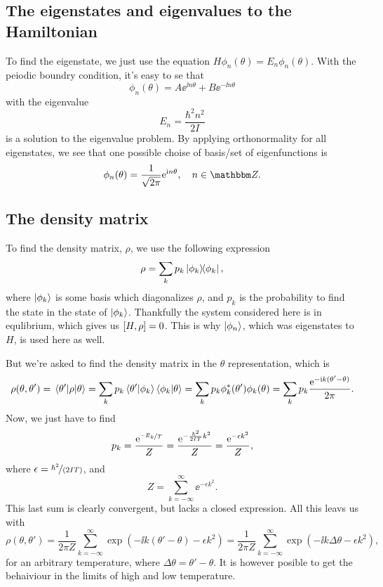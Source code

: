 \documentclass[11pt,letter, swedish, english
]{article}
\begin{document}
\subsection{The eigenstates and eigenvalues to the Hamiltonian}
To find the eigenstate, we just use the equation
$H\phi_n(\theta)=E_n\phi_n(\theta)$. With the peiodic boundry
condition, it's easy to se that
\begin{equation}
\phi_n(\theta)= A\ee^{\ii n\theta}+B\ee^{-\ii n\theta}
\end{equation}
with the eigenvalue
\begin{equation}
E_n=\frac{\hbar^2n^2}{2I}
\end{equation}
is a solution to the eigenvalue problem. By applying orthonormality
for all eigenstates, we see that one possible choise
of basis/set of eigenfunctions is
\begin{equation}
\phi_n(\theta)=\frac{1}{\sqrt{2\pi}}\ee^{\ii n\theta}\qcomma n\in\Z.
\end{equation}


\subsection{The density matrix}
To find the density matrix, $\rho$, we use the following expression
\begin{equation}
\rho = \sum_k p_k \op{\phi_k},
\end{equation}
where $\ket{\phi_k}$ is some basis which diagonalizes $\rho$, and
$p_k$ is the probability to find the state in the state of
$\ket{\phi_k}$. Thankfully the system considered here is in
equlibrium, which gives us $\comm{H}{\rho}=0$. This is why
$\ket{\phi_n}$, which was eigenstates to $H$, is used here as well. 

But we're asked to find the density matrix in the
$\theta$ representation, which is
\begin{equation}
\rho(\theta, \theta') = \mel{\theta'}{\rho}{\theta}
= \sum_k p_k \ip{\theta'}{\phi_k}\ip{\phi_k}{\theta}
= \sum_k p_k \phi_k^*(\theta')\phi_k(\theta)
= \sum_k p_k \frac{\ee^{-\ii k (\theta'-\theta)}}{2\pi}.
\end{equation}
Now, we just have to find
\begin{equation}
p_k = \frac{\mathrm{e}^{\nicefrac{-E_k}{T}}}{Z} 
=\frac{\mathrm{e}^{-\frac{\hbar^2}{2IT}k^2}}{Z} 
=\frac{\mathrm{e}^{-\epsilon k^2}}{Z}, 
\end{equation}
where $\epsilon=\nicefrac{\hbar^2}{(2IT)}$, and
\begin{equation}
Z=\sum_{k=-\infty}^\infty\ee^{-\epsilon k^2}.
\end{equation}
This last sum is clearly convergent, but lacks a closed
expression. All this leavs us with
\begin{equation}
\rho(\theta, \theta')
= \frac{1}{2\pi Z} 
\sum_{k=-\infty}^\infty \exp(-\ii k(\theta'-\theta) -\epsilon k^2)
= \frac{1}{2\pi Z} 
\sum_{k=-\infty}^\infty \exp(-\ii k\Delta\theta -\epsilon k^2),
\end{equation}
for an arbitrary temperature, where $\Delta\theta=\theta'-\theta$. It
is however posible to get the behaiviour in the limits of high and low
temperature. 
\end{document}
